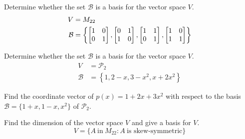 \documentclass[oneperpage]{gsypset}
\begin{document}
	\begin{problem}[6.2.20]
		Determine whether the set $\mathcal{B}$ is a basis for the vector space $V$.
		\begin{align*}
			V &= M_{22} \\
			\mathcal{B} &= \left\{
					\begin{bmatrix}1&0\\0&1\end{bmatrix},
					\begin{bmatrix}0&1\\1&0\end{bmatrix},
					\begin{bmatrix}1&1\\0&1\end{bmatrix},
					\begin{bmatrix}1&0\\1&1\end{bmatrix}
				\right\}
		\end{align*}
	\end{problem}
	\begin{solution}
		
	\end{solution}
	
	\begin{problem}[6.2.25]
		Determine whether the set $\mathcal{B}$ is a basis for the vector space $V$.
		\begin{align*}
			V &= \mathscr{P}_2 \\
			\mathcal{B} &= \left\{
					1,
					2 - x,
					3 - x^2,
					x + 2x^2
				\right\}
		\end{align*}
	\end{problem}
	\begin{solution}
		
	\end{solution}
	
	\begin{problem}[6.2.28]
		Find the coordinate vector of $p(x) = 1 + 2x + 3x^2$ with respect to the basis 
		$\mathcal{B}=\{1+x,1-x,x^2\}$ of $\mathscr{P}_2$.
	\end{problem}
	\begin{solution}
		
	\end{solution}
	
	\begin{problem}[6.2.38]
		Find the dimension of the vector space $V$ and give a basis for $V$.
		\[
			V = \{A\ \text{in}\ M_{22} \colon A\ \text{is skew-symmetric}\}
		\]
	\end{problem}
	\begin{solution}
		
	\end{solution}
	
\end{document}
